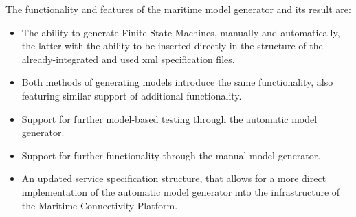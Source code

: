 The functionality and features of the maritime model generator and its result are:
\begin{itemize}
  \item The ability to generate Finite State Machines, manually and automatically, the latter with the ability to be inserted directly in the structure of the already-integrated and used xml specification files.
  \item Both methods of generating models introduce the same functionality, also featuring similar support of additional functionality.
  \item Support for further model-based testing through the automatic model generator.
  \item Support for further functionality through the manual model generator.
  \item An updated service specification structure, that allows for a more direct implementation of the automatic model generator into the infrastructure of the Maritime Connectivity Platform.
\end{itemize}


